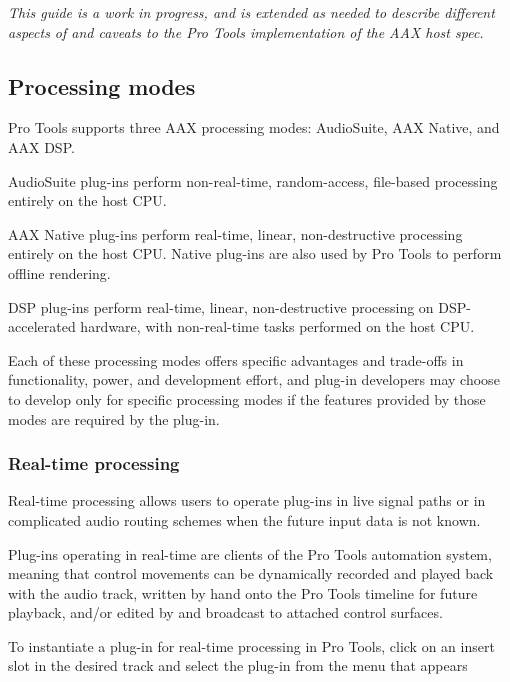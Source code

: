 {\itshape This guide is a work in progress, and is extended as needed to describe different aspects of and caveats to the Pro Tools implementation of the A\+AX host spec.} 

 \hypertarget{a00830_aax_pro_tools_guide_01_processing_modes}{}\subsection{Processing modes}\label{a00830_aax_pro_tools_guide_01_processing_modes}
Pro Tools supports three A\+AX processing modes\+: Audio\+Suite, A\+AX Native, and A\+AX D\+SP. 
\begin{DoxyItemize}
\item Audio\+Suite plug-\/ins perform non-\/real-\/time, random-\/access, file-\/based processing entirely on the host C\+PU.  
\item A\+AX Native plug-\/ins perform real-\/time, linear, non-\/destructive processing entirely on the host C\+PU. Native plug-\/ins are also used by Pro Tools to perform offline rendering.  
\item D\+SP plug-\/ins perform real-\/time, linear, non-\/destructive processing on D\+S\+P-\/accelerated hardware, with non-\/real-\/time tasks performed on the host C\+PU.  
\end{DoxyItemize}

Each of these processing modes offers specific advantages and trade-\/offs in functionality, power, and development effort, and plug-\/in developers may choose to develop only for specific processing modes if the features provided by those modes are required by the plug-\/in.

\hypertarget{a00830_subsection__realtime_processing}{}\subsubsection{Real-\/time processing}\label{a00830_subsection__realtime_processing}
 Real-\/time processing allows users to operate plug-\/ins in live signal paths or in complicated audio routing schemes when the future input data is not known.

Plug-\/ins operating in real-\/time are clients of the Pro Tools automation system, meaning that control movements can be dynamically recorded and played back with the audio track, written by hand onto the Pro Tools timeline for future playback, and/or edited by and broadcast to attached control surfaces.

To instantiate a plug-\/in for real-\/time processing in Pro Tools, click on an insert slot in the desired track and select the plug-\/in from the menu that appears

